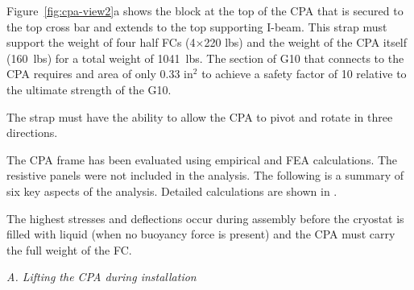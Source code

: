 Figure~\ref{fig:cpa-view2}a shows the block at the top of the CPA that is secured to the top cross bar and extends to the top supporting I-beam.  This strap must support the weight of four half FCs (4$\times$220 lbs) and the weight of the CPA itself (160~lbs) for a total weight of 1041~lbs. The section of G10 that connects to the CPA requires and area of only 0.33 in$^2$ to achieve a safety factor of 10 relative to the ultimate strength of the G10.  

The strap must have the ability to allow the CPA to pivot and rotate in three directions.  


The CPA frame has been evaluated using empirical and FEA calculations.  The resistive panels were not included in the analysis. The following is a summary of six key aspects of the analysis. Detailed calculations are shown in 
.  

The highest stresses and deflections occur during assembly before the cryostat is filled with liquid (when no buoyancy force is present) and the CPA must carry the full weight of the FC.




{\it A. Lifting the CPA during installation}


